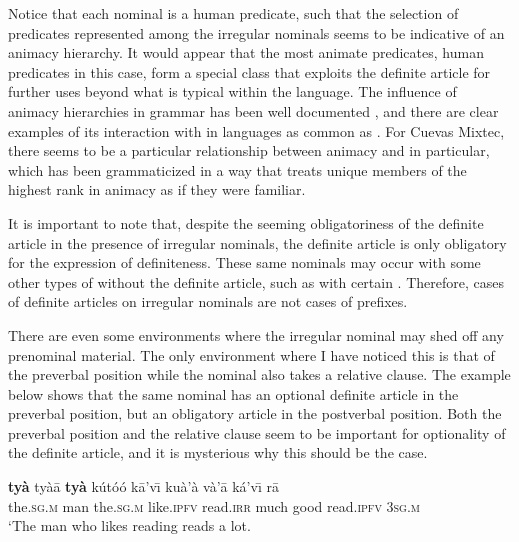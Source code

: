 \documentclass[output=paper,modfonts,nonflat]{langsci/langscibook}
\begin{document}
Notice that each nominal is a human predicate, such that the selection of predicates represented among the irregular nominals seems to be indicative of an animacy hierarchy.  It would appear that the most animate predicates, human predicates in this case, form a special class that exploits the definite article for further uses beyond what is typical within the language.  The influence of animacy hierarchies in grammar has been well documented \citep{Dahl1996}, and there are clear examples of its interaction with  in languages as common as .  For Cuevas Mixtec, there seems to be a particular relationship between animacy and  in particular, which has been grammaticized in a way that treats unique members of the highest rank in animacy as if they were familiar. 

It is important to note that, despite the seeming obligatoriness of the definite article in the presence of irregular nominals, the definite article is only obligatory for the expression of definiteness.  These same nominals may occur with some other types of  without the definite article, such as with certain .  Therefore, cases of definite articles on irregular nominals are not cases of prefixes.

\z 

There are even some environments where the irregular nominal may shed off any prenominal material.  The only environment where I have noticed this is that of the preverbal position while the nominal also takes a relative clause.  The example below shows that the same nominal has an optional definite article in the preverbal position, but an obligatory article in the postverbal position.  Both the preverbal position and the relative clause seem to be important for optionality of the definite article, and it is mysterious why this should be the case. 

\ea {}\label{ex:cisneros:76}
\ea
\gll
{\ob}{\op}\textbf{ty\`a}{\cp} ty\`a\=a \textbf{ty\`a} k\'ut\'o\'o k\=a'v\=\i{}{\cb} ku\`a'\`a v\`a'\=a k\'a'v\=\i{} r\=a\\
\phantom{[(}the.\textsc{sg.m} man the.\textsc{sg.m} like.\textsc{ipfv} read.\textsc{irr} much good read.\textsc{ipfv} 3\textsc{sg.m}\\
\glt
`The man who likes reading reads a lot.
\end{document}
